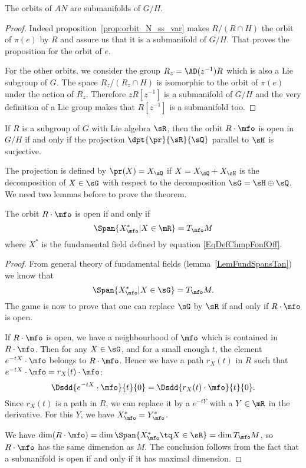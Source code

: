 \begin{proposition} \label{pg:orbit_ssvar}
	The orbits of $AN$ are submanifolds of $G/H$.
\end{proposition}

\begin{proof}
	Indeed proposition~\ref{prop:orbit_N_ss_var} makes $R/(R\cap H)$ the orbit of $\pi(e)$ by $R$ and assure us that it is a submanifold of $G/H$. That proves the proposition for the orbit of $e$.

	For the other orbits, we consider the group $R_z=\AD(z^{-1})R$ which is also a Lie  subgroup of $G$. The space $R_z/(R_z\cap H)$ is isomorphic to the orbit of $\pi(e)$ under the action of $R_z$. Therefore $zR[z^{-1}]$ is a submanifold of $G/H$ and the very definition of a Lie group makes that  $R[z^{-1}]$ is a submanifold too.

\end{proof}

\begin{theorem} \label{tho:pr_ouvert}
	If $R$ is a subgroup of $G$ with Lie algebra $\sR$, then the orbit $R\cdot \mfo$ is open in $G/H$ if and only if the projection $\dpt{\pr}{\sR}{\sQ}$ parallel to $\sH$ is surjective.
\end{theorem}

The projection is defined by $\pr(X)=X_{\sQ}$ if $X=X_{\sQ}+X_{\sH}$ is the decomposition of $X\in\sG$ with respect to the decomposition $\sG=\sH\oplus\sQ$. We need two lemmas before to prove the theorem.

\begin{lemma}
	The orbit $R\cdot\mfo$ is open if and only if
	\[
		\Span\{X^*_{\mfo}|X\in\mR\}=T_{\mfo}M
	\]
	where $X^*$ is the fundamental field defined by equation \eqref{EqDefChmpFonfOff}.
	\label{lem:equiv_1}
\end{lemma}

\begin{proof}
	From general theory of fundamental fields (lemma~\ref{LemFundSpansTan}) we know that
	\[
		\Span\{X^*_{\mfo}|X\in\sG\}=T_{\mfo}M.
	\]
	The game is now to prove that one can replace $\sG$ by $\sR$ if and only if $R\cdot \mfo$ is open.

	If $R\cdot\mfo$ is open, we have a neighbourhood of $\mfo$ which is contained in $R\cdot\mfo$. Then for any $X\in\sG$, and for a small enough $t$, the element $e^{-tX}\cdot\mfo$ belongs to $R\cdot\mfo$. Hence we have a path $r_X(t)$ in $R$ such that $e^{-tX}\cdot\mfo=r_X(t)\cdot\mfo$:
	\[
		\Dsdd{e^{-tX}\cdot\mfo}{t}{0}=\Dsdd{r_X(t)\cdot\mfo}{t}{0}.
	\]
	Since $r_X(t)$ is a path in $R$, we can replace it by a $e^{-tY}$ with a $Y\in\mR$ in the derivative. For this $Y$, we have $X^*_{\mfo}=Y^*_{\mfo}$.

	 We have $\dim(R\cdot\mfo)=\dim\Span\{ X^*_{\mfo}\tq X\in\sR \}=\dim T_{\mfo}M$,
	so $R\cdot\mfo$ has the same dimension as $M$. The conclusion follows from the fact that a submanifold is open if and only if it has maximal dimension.

\end{proof}

